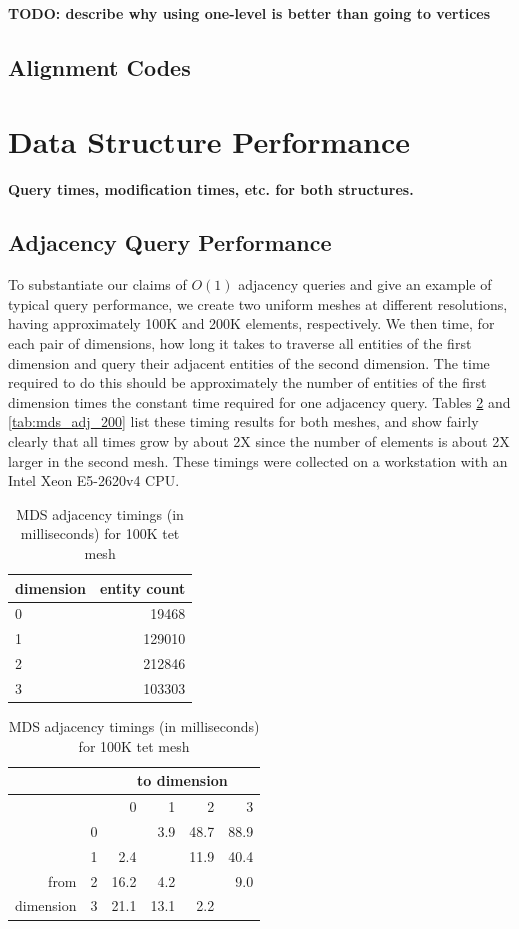 {\bf TODO: describe why using one-level is better than going to vertices}

\subsection{Alignment Codes}

\section{Data Structure Performance}

{\bf Query times, modification times, etc. for both structures.}

\subsection{Adjacency Query Performance}

To substantiate our claims of $O(1)$ adjacency queries and
give an example of typical query performance, we create two
uniform meshes at different resolutions, having approximately
100K and 200K elements, respectively.
We then time, for each pair of dimensions, how long it takes
to traverse all entities of the first dimension and query their
adjacent entities of the second dimension.
The time required to do this should be approximately the number
of entities of the first dimension times the constant time
required for one adjacency query.
Tables \ref{tab:mds_adj_100} and \ref{tab:mds_adj_200} list these timing
results for both meshes, and show fairly clearly that all times
grow by about 2X since the number of elements is about 2X larger
in the second mesh.
These timings were collected on a workstation with an Intel Xeon E5-2620v4 CPU.

\begin{table}
\caption{MDS adjacency timings (in milliseconds) for 100K tet mesh}
\label{tab:mds_adj_100}
\begin{center}
\begin{tabular}{l|r|}
dimension & entity count \\\hline
0 & 19468 \\
1 & 129010 \\
2 & 212846 \\
3 & 103303 \\
\end{tabular}
\begin{tabular}{|r|r|r r r r}
               &   & \multicolumn{4}{c}{to dimension} \\\hline
               &   &    0 &    1 &    2 &   3  \\\hline
               & 0 &      &  3.9 & 48.7 & 88.9 \\
               & 1 &  2.4 &      & 11.9 & 40.4 \\
from           & 2 & 16.2 &  4.2 &      &  9.0 \\
dimension      & 3 & 21.1 & 13.1 &  2.2 &      \\
\end{tabular}
\end{center}
\end{table}

